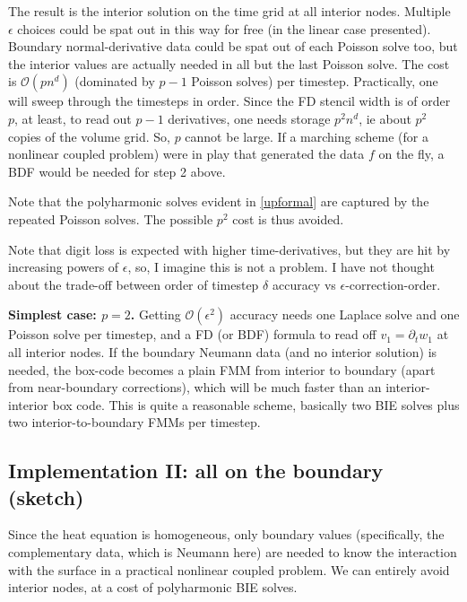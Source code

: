 \documentclass[10pt]{article}
\newcommand{\bigO}{{\mathcal O}}
\newcommand{\eps}{\epsilon}
\newcommand{\dt}{\partial_t}
\begin{document}
The result is the interior solution on the time grid at all interior nodes.
Multiple $\eps$ choices could be spat out in this way for free
(in the linear case presented).
Boundary normal-derivative
data could be spat out of each Poisson solve too, but the interior
values are actually needed in all but the last Poisson solve.
The cost is $\bigO(pn^d)$ (dominated by $p-1$ Poisson solves)
per timestep.
Practically, one will sweep through the timesteps in order.
Since the FD stencil width is of order $p$, at least,
to read out $p-1$ derivatives, one needs storage $p^2n^d$,
ie about $p^2$ copies of the volume grid.
So, $p$ cannot be large.
If a marching scheme (for a nonlinear coupled problem) were in play
that generated the data $f$ on the fly,
a BDF would be needed for step 2 above.

Note that the polyharmonic solves evident in \eqref{upformal}
are captured by the repeated Poisson solves. The possible $p^2$ cost is
thus avoided.

Note that digit loss is expected with higher time-derivatives,
but they are hit by increasing powers of $\eps$, so, I imagine this
is not a problem.
I have not thought about the trade-off between order of timestep $\delta$
accuracy vs $\eps$-correction-order.

{\bf Simplest case: $p=2$.}
Getting $\bigO(\eps^2)$ accuracy needs one Laplace solve
and one Poisson solve per timestep, and a FD (or BDF) formula
to read off $v_1 = \dt w_1$ at all interior nodes.
If the boundary Neumann data (and no interior solution) is needed,
the box-code becomes a plain FMM from interior to boundary
(apart from near-boundary corrections), which will be much faster than
an interior-interior box code.
This is quite a reasonable scheme, basically two
BIE solves plus two interior-to-boundary FMMs per timestep.



\subsection{Implementation II: all on the boundary (sketch)}

Since the heat equation is homogeneous, only boundary values
(specifically, the complementary data, which is Neumann here)
are needed to know the interaction with the surface in a practical
nonlinear coupled problem.
We can entirely avoid interior nodes,
at a cost of polyharmonic BIE solves.
\end{document}
